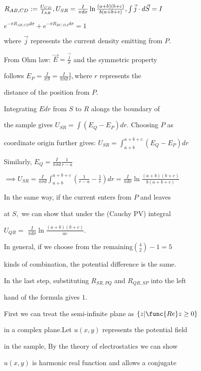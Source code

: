 \documentclass{article}
\begin{document}
$R_{AB,CD}:=\frac{U_{CD}}{I_{AB}},U_{SR}=\frac{I}{\pi d\sigma }\ln \frac{%
\left( a+b\right) \left( b+c\right) }{b\left( a+b+c\right) },\int \vec{j}%
\cdot d\vec{S}=I$

$e^{-\pi R_{AB,CD}d\sigma }+e^{-\pi R_{BC,DA}d\sigma }=1$

where $\vec{j}$ represents the current density emitting from $P.$

From Ohm law: $\vec{E}=\frac{\vec{j}}{\sigma }$ and the symmetric property

follows $E_{P}=\frac{I}{\sigma S}=\frac{I}{\pi \sigma d}\frac{1}{r},$where $%
r $ represents the

distance of the position from $P.$

Integrating $Edr$ from $S$ to $R$ alongs the boundary of

the sample gives $U_{SR}=\int \left( E_{Q}-E_{P}\right) dr.$ Choosing $P$ as

coordinate origin further gives: $U_{SR}=\int_{a+b}^{a+b+c}\left(
E_{Q}-E_{P}\right) dr$

Similarly, $E_{Q}=\frac{I}{\pi \sigma d}\frac{1}{r-a}$

$\implies U_{SR}=\frac{I}{\pi \sigma d}\int_{a+b}^{a+b+c}\left( \frac{1}{r-a}%
-\frac{1}{r}\right) dr=\frac{I}{\pi d\sigma }\ln \frac{\left( a+b\right)
\left( b+c\right) }{b\left( a+b+c\right) }$

In the same way, if the current enters from $P$ and leaves

at $S,$ we can show that under the (Cauchy PV) integral

$U_{QR}=$ $\frac{I}{\pi d\sigma }\ln \frac{\left( a+b\right) \left(
b+c\right) }{ac}.$

In general, if we choose from the remaining$\binom{4}{2}-1=5$

kinds of combination, the potential difference is the same.

In the last step, substituting $R_{SR,PQ}$ and $R_{QR,SP}$ into the left

hand of the formula gives $1.$

\bigskip

First we can treat the semi-infinite plane as $\left\{ z|\func{Re}z\geq
0\right\} $

in a complex plane.Let $u\left( x,y\right) $ represents the potential field

in the sample, By the theory of electrostatics we can show

$u\left( x,y\right) $ is harmonic real function and allows a conjugate
\end{document}
